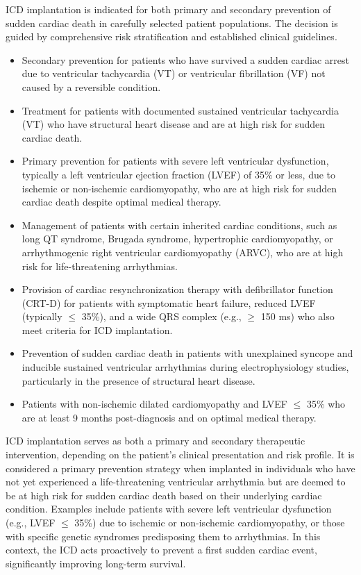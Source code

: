 ICD implantation is indicated for both primary and secondary prevention of sudden cardiac death in carefully selected patient populations. The decision is guided by comprehensive risk stratification and established clinical guidelines.

\begin{itemize}
  \item Secondary prevention for patients who have survived a sudden cardiac arrest due to ventricular tachycardia (VT) or ventricular fibrillation (VF) not caused by a reversible condition.
  \item Treatment for patients with documented sustained ventricular tachycardia (VT) who have structural heart disease and are at high risk for sudden cardiac death.
  \item Primary prevention for patients with severe left ventricular dysfunction, typically a left ventricular ejection fraction (LVEF) of 35\% or less, due to ischemic or non-ischemic cardiomyopathy, who are at high risk for sudden cardiac death despite optimal medical therapy.
  \item Management of patients with certain inherited cardiac conditions, such as long QT syndrome, Brugada syndrome, hypertrophic cardiomyopathy, or arrhythmogenic right ventricular cardiomyopathy (ARVC), who are at high risk for life-threatening arrhythmias.
  \item Provision of cardiac resynchronization therapy with defibrillator function (CRT-D) for patients with symptomatic heart failure, reduced LVEF (typically $\leq$ 35\%), and a wide QRS complex (e.g., $\geq$ 150 ms) who also meet criteria for ICD implantation.
  \item Prevention of sudden cardiac death in patients with unexplained syncope and inducible sustained ventricular arrhythmias during electrophysiology studies, particularly in the presence of structural heart disease.
  \item Patients with non-ischemic dilated cardiomyopathy and LVEF $\leq$ 35\% who are at least 9 months post-diagnosis and on optimal medical therapy.
\end{itemize}

ICD implantation serves as both a primary and secondary therapeutic intervention, depending on the patient's clinical presentation and risk profile. It is considered a primary prevention strategy when implanted in individuals who have not yet experienced a life-threatening ventricular arrhythmia but are deemed to be at high risk for sudden cardiac death based on their underlying cardiac condition. Examples include patients with severe left ventricular dysfunction (e.g., LVEF $\leq$ 35\%) due to ischemic or non-ischemic cardiomyopathy, or those with specific genetic syndromes predisposing them to arrhythmias. In this context, the ICD acts proactively to prevent a first sudden cardiac event, significantly improving long-term survival.

